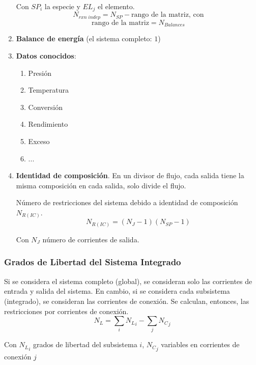 \begin{enumerate}
                Con \(SP_{i}\) la especie y \(EL_{j}\) el elemento.
                \[N_{rxn\;indep} = N_{SP} - \text{rango de la matriz, con}\]
                \[\text{rango de la matriz} = N_{Balances}\]
                \item \textbf{Balance de energía} (el sistema completo: \(1\))
                \item \textbf{Datos conocidos}:
                \begin{multicols}{3}
                    \begin{enumerate}
                        \item Presión
                        \item Temperatura
                        \item Conversión
                        \item Rendimiento
                        \item Exceso
                        \item ...
                    \end{enumerate}
                \end{multicols}
                \item \textbf{Identidad de composición}. En un divisor de flujo, cada salida tiene la misma composición en cada salida, solo divide el flujo.
                
                Número de restricciones del sistema debido a identidad de composición \(N_{R(IC)}\).
                \[N_{R(IC)} = (N_{J} - 1 )(N_{SP} - 1)\]
                
                Con \(N_{J}\) número de corrientes de salida.
            \end{enumerate}
        
        \subsubsection{Grados de Libertad del Sistema Integrado}
        
        Si se considera el sistema completo (global), se consideran solo las corrientes de entrada y salida del sistema. En cambio, si se considera cada subsistema (integrado), se consideran las corrientes de conexión. Se calculan, entonces, las restricciones por corrientes de conexión.
        \[N_{L} = \sum_{i} {N_{L}}_{i} - \sum_{j} {N_{C}}_{j}\]
        
        Con \({N_{L}}_{i}\) grados de libertad del subsistema \(i\), \({N_{C}}_{j}\) variables en corrientes de conexión \(j\)
        
